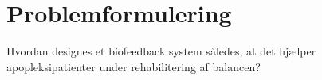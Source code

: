 \section{Problemformulering}
Hvordan designes et biofeedback system således, at det hjælper apopleksipatienter under rehabilitering af balancen?


